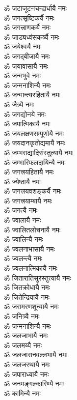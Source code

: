 \begin{flushleft}
\begin{multicols}{2}
ॐ जटाजूटनचन्द्रार्धायै नमः\\
ॐ जगत्सृष्टिकर्यै नमः\\
ॐ जगत्त्राणकर्यै नमः\\
ॐ जाड्यध्वंसकर्त्र्यै नमः\hfill{}\\
ॐ जयेश्वर्यै नमः\\
ॐ जगद्बीजायै नमः\\
ॐ जयावासायै नमः\\
ॐ जन्मभुवे नमः\\
ॐ जन्मनाशिन्यै नमः\\
ॐ जन्मान्त्यरहितायै नमः\\
ॐ जैत्र्यै नमः\\
ॐ जगद्योनये नमः\\
ॐ जपात्मिकायै नमः\\
ॐ जयलक्षणसम्पूर्णायै नमः\hfill{}\\
ॐ जयदानकृतोद्यमायै नमः\\
ॐ जम्भराद्यादिसंस्तुत्यायै नमः\\
ॐ जम्भारिफलदायिन्यै नमः\\
ॐ जगत्त्रयहितायै नमः\\
ॐ ज्येष्ठायै नमः\\
ॐ जगत्त्रयवशङ्कर्यै नमः\\
ॐ जगत्त्रयाम्बायै नमः\\
ॐ जगत्यै नमः\\
ॐ ज्वालायै नमः\\
ॐ ज्वालितलोचनायै नमः\hfill{}\\
ॐ ज्वालिन्यै नमः\\
ॐ ज्वलनाभासायै नमः\\
ॐ ज्वलन्त्यै नमः\\
ॐ ज्वलनात्मिकायै नमः\\
ॐ जितारातिसुरस्तुत्यायै नमः\\
ॐ जितक्रोधायै नमः\\
ॐ जितेन्द्रियायै नमः\\
ॐ जरामरणशून्यायै नमः\\
ॐ जनित्र्यै नमः\\
ॐ जन्मनाशिन्यै नमः\hfill{}\\
ॐ जलजाभायै नमः\\
ॐ जलमय्यै नमः\\
ॐ जलजासनवल्लभायै नमः\\
ॐ जलजस्थायै नमः\\
ॐ जपाराध्यायै नमः\\
ॐ जनमङ्गल्कारिण्यै नमः\\
ॐ कामिन्यै नमः\\

\end{multicols}
\end{flushleft}
